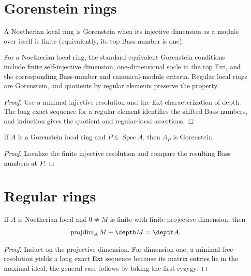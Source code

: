 \section{Gorenstein rings}
\begin{definition}\label{mcrt-def-gorenstein}\uses{}
A Noetherian local ring is Gorenstein when its injective dimension as a module
over itself is finite (equivalently, its top Bass number is one).
\end{definition}
\begin{theorem}\label{mcrt-thm-18-1}
For a Noetherian local ring, the standard equivalent Gorenstein conditions
include finite self-injective dimension, one-dimensional socle in the top Ext,
and the corresponding Bass-number and canonical-module criteria.  Regular local
rings are Gorenstein, and quotients by regular elements preserve the property.
\end{theorem}
\begin{proof}
Use a minimal injective resolution and the Ext characterization of depth.  The
long exact sequence for a regular element identifies the shifted Bass numbers,
and induction gives the quotient and regular-local assertions.
\end{proof}

\begin{theorem}\label{mcrt-thm-18-2}\notready
If $A$ is a Gorenstein local ring and $P\in\operatorname{Spec}A$, then $A_P$
is Gorenstein.
\end{theorem}
\begin{proof}
Localize the finite injective resolution and compare the resulting Bass numbers
at $P$.
\end{proof}

\section{Regular rings}
\begin{theorem}\label{mcrt-thm-19-1}
If $A$ is Noetherian local and $0\ne M$ is finite with finite projective
dimension, then
\[
\operatorname{projdim}_A M+\depth M=\depth A.
\]
\end{theorem}
\begin{proof}
Induct on the projective dimension.  For dimension one, a minimal free
resolution yields a long exact Ext sequence because its matrix entries lie in
the maximal ideal; the general case follows by taking the first syzygy.
\end{proof}

